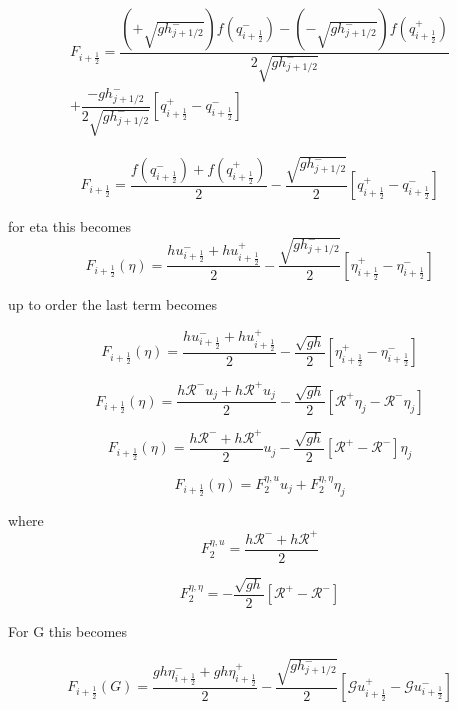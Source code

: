 \documentclass[12pt]{article}
\begin{document}
\begin{multline}
F_{i+\frac{1}{2}} = \dfrac{\left(+ \sqrt{g h^-_{j + 1/2}}\right) f\left(q^-_{i+\frac{1}{2}}\right) - \left( - \sqrt{g h^-_{j + 1/2}}\right) f\left(q^+_{i+\frac{1}{2}}\right)}{ 2\sqrt{g h^-_{j + 1/2}}} \\ + \dfrac{ - g h^-_{j + 1/2}}{{ 2\sqrt{g h^-_{j + 1/2}}}} \left [ q^+_{i+\frac{1}{2}} - q^-_{i+\frac{1}{2}} \right ]
\end{multline}

\begin{multline}
F_{i+\frac{1}{2}} = \dfrac{ f\left(q^-_{i+\frac{1}{2}}\right) + f\left(q^+_{i+\frac{1}{2}}\right)}{ 2}  - \dfrac{ \sqrt{g h^-_{j + 1/2}}}{ 2} \left [ q^+_{i+\frac{1}{2}} - q^-_{i+\frac{1}{2}} \right ]
\end{multline}

for eta this becomes
\[F_{i+\frac{1}{2}}(\eta) = \dfrac{ hu^-_{i+\frac{1}{2}}+ hu^+_{i+\frac{1}{2}}}{ 2}  - \dfrac{ \sqrt{g h^-_{j + 1/2}}}{ 2} \left [ \eta^+_{i+\frac{1}{2}} - \eta^-_{i+\frac{1}{2}} \right ]\]

up to order the last term becomes

\[F_{i+\frac{1}{2}}(\eta) = \dfrac{ hu^-_{i+\frac{1}{2}}+ hu^+_{i+\frac{1}{2}}}{ 2}  - \dfrac{ \sqrt{g h}}{ 2} \left [ \eta^+_{i+\frac{1}{2}} - \eta^-_{i+\frac{1}{2}} \right ]\]

\[F_{i+\frac{1}{2}}(\eta) = \dfrac{ h\mathcal{R}^-u_{j}+ h\mathcal{R}^+u_{j}}{ 2}  - \dfrac{ \sqrt{g h}}{ 2} \left [ \mathcal{R}^+\eta_{j} - \mathcal{R}^-\eta_{j} \right ]\]

\[F_{i+\frac{1}{2}}(\eta) = \dfrac{ h\mathcal{R}^-+ h\mathcal{R}^+}{ 2} u_{j} - \dfrac{ \sqrt{g h}}{ 2} \left [ \mathcal{R}^+ - \mathcal{R}^- \right ] \eta_{j}\]

\[F_{i+\frac{1}{2}}(\eta) = F^{\eta,u}_2 u_{j} + F^{\eta,\eta}_2 \eta_{j}\]

where
\[ F^{\eta,u}_2 = \dfrac{ h\mathcal{R}^-+ h\mathcal{R}^+}{ 2}\]

\[ F^{\eta,\eta}_2 = -\dfrac{ \sqrt{g h}}{ 2} \left [ \mathcal{R}^+ - \mathcal{R}^- \right ]\]

For G this becomes

\begin{multline}
F_{i+\frac{1}{2}}(G) = \dfrac{ gh\eta^-_{i+\frac{1}{2}} + gh\eta^+_{i+\frac{1}{2}}}{ 2}  - \dfrac{ \sqrt{g h^-_{j + 1/2}}}{ 2} \left [ \mathcal{G}u^+_{i+\frac{1}{2}} - \mathcal{G}u^-_{i+\frac{1}{2}} \right ]
\end{multline}
\end{document}
